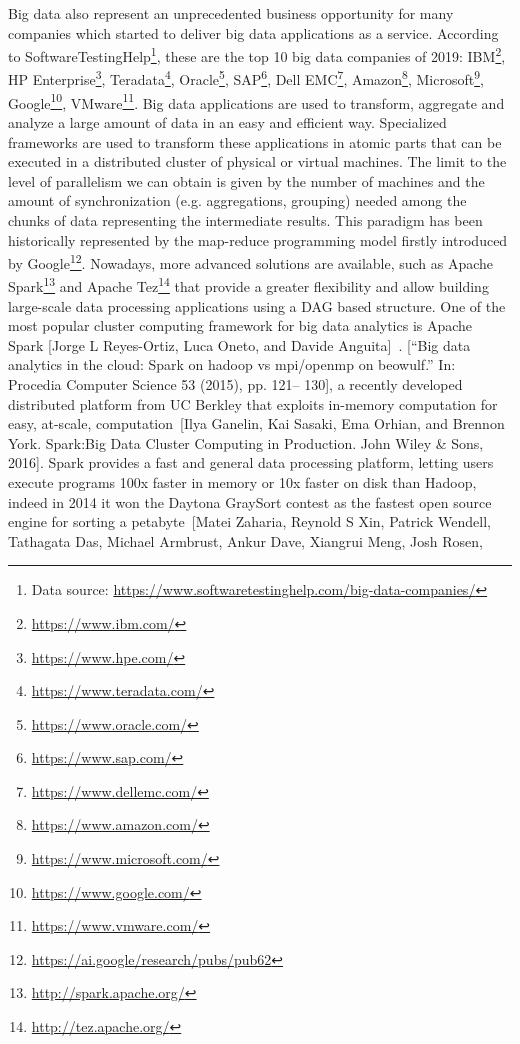 Big data also represent an unprecedented business opportunity for many companies which started to deliver big data applications as a service. According to SoftwareTestingHelp\footnote{Data source: \url{https://www.softwaretestinghelp.com/big-data-companies/}}, these are the top 10 big data companies of 2019: IBM\footnote{\url{https://www.ibm.com/}}, HP Enterprise\footnote{\url{https://www.hpe.com/}}, Teradata\footnote{\url{https://www.teradata.com/}}, Oracle\footnote{\url{https://www.oracle.com/}}, SAP\footnote{\url{https://www.sap.com/}}, Dell EMC\footnote{\url{https://www.dellemc.com/}}, Amazon\footnote{\url{https://www.amazon.com/}}, Microsoft\footnote{\url{https://www.microsoft.com/}}, Google\footnote{\url{https://www.google.com/}}, VMware\footnote{\url{https://www.vmware.com/}}.
Big data applications are used to transform, aggregate and analyze a large amount of data in an easy and efficient way. Specialized frameworks are used to transform these applications in atomic parts that can be executed in a distributed cluster of physical or virtual machines. The limit to the level of parallelism we can obtain is given by the number of machines and the amount of synchronization (e.g. aggregations, grouping) needed among the chunks of data representing the intermediate results. This paradigm has been historically represented by the map-reduce programming model firstly introduced by Google\footnote{\url{https://ai.google/research/pubs/pub62}}. Nowadays, more advanced solutions are available, such as Apache Spark\footnote{\url{http://spark.apache.org/}} and Apache  Tez\footnote{\url{http://tez.apache.org/}} that provide a greater flexibility and allow building large-scale data processing applications using a DAG based structure.
One of the most popular cluster computing framework for big data analytics is Apache Spark [Jorge L Reyes-Ortiz, Luca Oneto, and Davide Anguita]~\cite{articleApacheSpark:2015}. [“Big data analytics in the cloud: Spark on hadoop vs mpi/openmp on beowulf.” In: Procedia Computer Science 53 (2015), pp. 121– 130], a recently developed distributed platform from UC Berkley that exploits in-memory computation for easy, at-scale, computation~\cite{bookSpark:2016}[Ilya Ganelin, Kai Sasaki, Ema Orhian, and Brennon York. Spark:Big Data Cluster Computing in Production. John Wiley \& Sons, 2016]. Spark provides a fast and general data processing platform, letting users execute programs 100x faster in memory or 10x faster on disk than Hadoop, indeed in 2014 it won the Daytona GraySort contest as the fastest open source engine for sorting a petabyte~\cite{articleApacheSpark:2016}[Matei Zaharia, Reynold S Xin, Patrick Wendell, Tathagata Das, Michael Armbrust, Ankur Dave, Xiangrui Meng, Josh Rosen,
